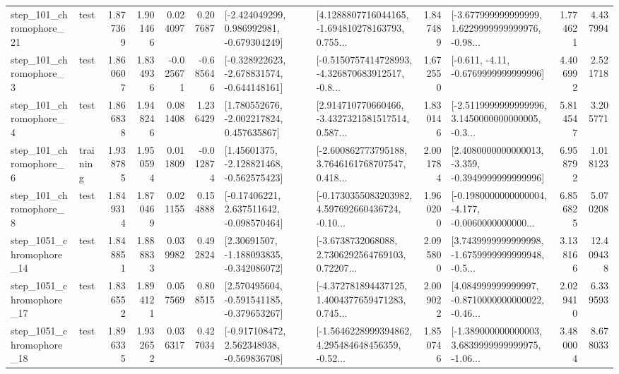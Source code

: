 \begin{tabular}{llrrrrllrlrr}
  step\_101\_chromophore\_21 &      test &      1.877369 &    1.901466 &      0.024097 &  0.207687 &   [-2.424049299, 0.986992981, -0.679304249] &  [4.1288807716044165, -1.694810278163793, 0.755... &       1.847489 &  [-3.677999999999999, 1.6229999999999976, -0.98... &            1.774621 &          4.437994 \\
   step\_101\_chromophore\_3 &      test &      1.860607 &    1.834936 &     -0.025671 & -0.685646 &  [-0.328922623, -2.678831574, -0.644148161] &  [-0.5150757414728993, -4.326870683912517, -0.8... &       1.672550 &               [-0.611, -4.11, -0.6769999999999996] &            4.406992 &          2.521718 \\
   step\_101\_chromophore\_4 &      test &      1.866838 &    1.948246 &      0.081408 &  1.236429 &    [1.780552676, -2.002217824, 0.457635867] &  [2.914710770660466, -3.4327321581517514, 0.587... &       1.830146 &  [-2.5119999999999996, 3.1450000000000005, -0.3... &            5.814547 &          3.205771 \\
   step\_101\_chromophore\_6 &  training &      1.938785 &    1.950594 &      0.011809 & -0.012874 &    [1.45601375, -2.128821468, -0.562575423] &  [-2.600862773795188, 3.7646161768707547, 0.418... &       2.001784 &  [2.4080000000000013, -3.359, -0.3949999999999996] &            6.958792 &          1.018123 \\
   step\_101\_chromophore\_8 &      test &      1.849314 &    1.870469 &      0.021155 &  0.154888 &    [-0.17406221, 2.637511642, -0.098570464] &  [-0.1730355083203982, 4.597692660436724, -0.10... &       1.960200 &  [-0.1980000000000004, -4.177, -0.0060000000000... &            6.856825 &          5.070208 \\
 step\_1051\_chromophore\_14 &      test &      1.848851 &    1.888833 &      0.039982 &  0.492824 &    [2.30691507, -1.188093835, -0.342086072] &  [-3.6738732068088, 2.7306292564769103, 0.72207... &       2.095800 &  [3.7439999999999998, -1.6759999999999948, -0.5... &            3.138166 &         12.409438 \\
 step\_1051\_chromophore\_17 &      test &      1.836552 &    1.894121 &      0.057569 &  0.808515 &   [2.570495604, -0.591541185, -0.379653267] &  [-4.372781894437125, 1.4004377659471283, 0.745... &       2.009022 &  [4.084999999999997, -0.8710000000000022, -0.46... &            2.029410 &          6.339593 \\
 step\_1051\_chromophore\_18 &      test &      1.896335 &    1.932652 &      0.036317 &  0.427034 &   [-0.917108472, 2.562348938, -0.569836708] &  [-1.5646228999394862, 4.295484648456359, -0.52... &       1.850746 &  [-1.389000000000003, 3.6839999999999975, -1.06... &            3.480004 &          8.678033 \\

\end{tabular}
